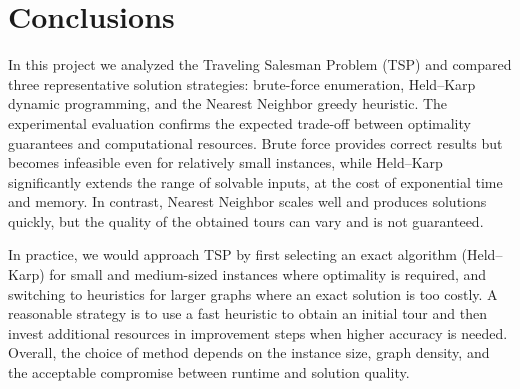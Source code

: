 \section{Conclusions}
\label{sec:conclusions}

In this project we analyzed the Traveling Salesman Problem (TSP) and compared three representative solution strategies: brute-force enumeration, Held–Karp dynamic programming, and the Nearest Neighbor greedy heuristic. The experimental evaluation confirms the expected trade-off between optimality guarantees and computational resources. Brute force provides correct results but becomes infeasible even for relatively small instances, while Held–Karp significantly extends the range of solvable inputs, at the cost of exponential time and memory. In contrast, Nearest Neighbor scales well and produces solutions quickly, but the quality of the obtained tours can vary and is not guaranteed.

In practice, we would approach TSP by first selecting an exact algorithm (Held–Karp) for small and medium-sized instances where optimality is required, and switching to heuristics for larger graphs where an exact solution is too costly. A reasonable strategy is to use a fast heuristic to obtain an initial tour and then invest additional resources in improvement steps when higher accuracy is needed. Overall, the choice of method depends on the instance size, graph density, and the acceptable compromise between runtime and solution quality.
